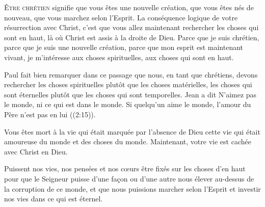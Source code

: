 \dvrule







\lettrine{Ê}{tre chrétien} signifie que vous êtes une nouvelle création,
 que vous êtes nés de nouveau, que vous marchez selon l'Esprit.
 La conséquence logique de votre résurrection avec Christ,
 c'est que vous allez maintenant rechercher les choses
 qui sont en haut, là où Christ est assis à la droite de Dieu.
 Parce que je suis chrétien, parce que je suis une nouvelle création,
 parce que mon esprit est maintenant vivant, je m'intéresse aux choses
 spirituelles, aux choses qui sont en haut.


Paul fait bien remarquer dans ce passage que nous,
 en tant que chrétiens, devons rechercher les choses spirituelles
 plutôt que les choses matérielles, les choses qui sont éternelles plutôt
 que les choses qui sont temporelles. Jean a dit\frcolon{} 
 \Og N'aimez pas le monde, ni ce qui est dans le monde.
 Si quelqu'un aime le monde, l'amour du Père n'est pas en lui \Fg{}
 ((2:15)). 

Vous êtes mort à la vie qui était marquée par l'absence de Dieu
 \ocadr cette vie qui était amoureuse du monde et des choses du monde.
 Maintenant, votre vie est cachée avec Christ en Dieu.

Puissent nos vies, nos pensées et nos c\oe{}urs être fixés
 sur les choses d'en haut \ocadr pour que le Seigneur puisse d'une fa\c{c}on
 ou d'une autre nous élever au-dessus de la corruption de ce monde,
 et que nous puissions marcher selon l'Esprit et investir nos vies
 dans ce qui est éternel.

